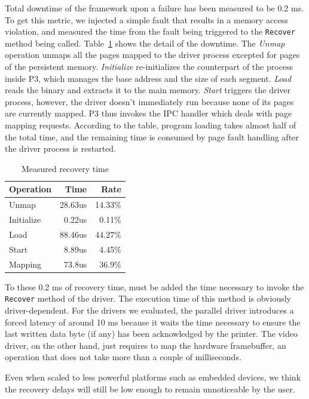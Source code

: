 \documentclass[times, 10pt, twocolumn]{article}
\begin{document}
Total downtime of the framework upon a failure has been measured to be 0.2 ms.  To get this metric, we injected a simple fault that results in a memory access violation, and measured the time from the fault being triggered to the {\tt Recover} method being called.  Table~\ref{tbl:recovery} shows the detail of the downtime.  The {\it Unmap} operation unmaps all the pages mapped to the driver process excepted for pages of the persistent memory.  {\it Initialize} re-initializes the counterpart of the process inside P3, which manages the base address and the size of each segment.  {\it Load} reads the binary and extracts it to the main memory. {\it Start} triggers the driver process, however, the driver doesn't immediately run because none of its pages are currently mapped.  P3 thus invokes the IPC handler which deals with page mapping requests.  According to the table, program loading takes almost half of the total time, and the remaining time is consumed by page fault handling after the driver process is restarted.

\begin{table}[ht]
\centering
\caption{Measured recovery time}
\label{tbl:recovery}
\begin{tabular}{|l|r|r|} \hline
{\bf Operation}&{\bf Time}&{\bf Rate}\\ \hline
Unmap & 28.63us & 14.33\% \\ \hline
Initialize & 0.22us & 0.11\% \\ \hline
Load & 88.46us & 44.27\% \\ \hline
Start &  8.89us & 4.45\% \\ \hline
Mapping & 73.8us & 36.9\%\\ \hline
\end{tabular}
\end{table}

To these 0.2 ms of recovery time, must be added the time necessary to invoke the \texttt{Recover} method of the driver. The execution time of this method is obviously driver-dependent. For the drivers we evaluated, the parallel driver introduces a forced latency of around 10 ms because it waits the time necessary to ensure the last written data byte (if any) has been acknowledged by the printer. The video driver, on the other hand, just requires to map the hardware framebuffer, an operation that does not take more than a couple of milliseconds.

Even when scaled to less powerful platforms such as embedded devices, we think the recovery delays will still be low enough to remain unnoticeable by the user.
\end{document}
